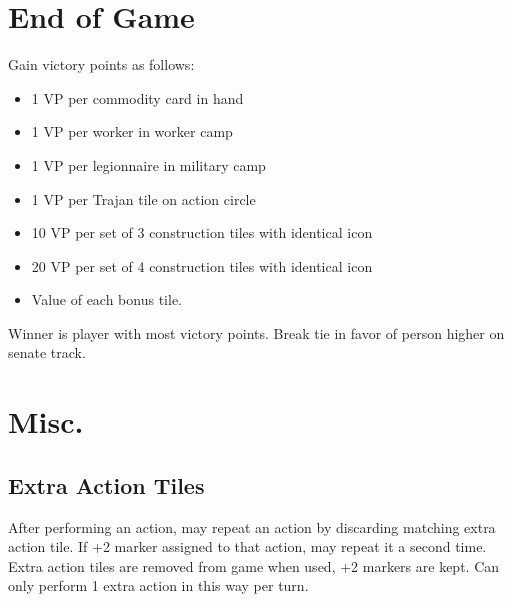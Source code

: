 \documentclass[10pt]{article}
\newenvironment{itemizeCustom}
{\begin{itemize}
  \setlength{\itemsep}{1pt}
  \setlength{\parskip}{0pt}
  \setlength{\parsep}{0pt}}
{\end{itemize}}
\begin{document}
\begin{multicols*}{2}
\section*{End of Game}
Gain victory points as follows:
\begin{itemizeCustom}
    \item 1 VP per commodity card in hand
    \item 1 VP per worker in worker camp
    \item 1 VP per legionnaire in military camp
    \item 1 VP per Trajan tile on action circle
    \item 10 VP per set of 3 construction tiles with identical icon
    \item 20 VP per set of 4 construction tiles with identical icon
    \item Value of each bonus tile.
\end{itemizeCustom}

Winner is player with most victory points. Break tie in favor of person higher on senate track.

\section*{Misc.}
\subsection*{Extra Action Tiles}
After performing an action, may repeat an action by discarding matching extra action tile. If +2 marker assigned to that action, may repeat it a second time. Extra action tiles are removed from game when used, +2 markers are kept. Can only perform 1 extra action in this way per turn.

\end{multicols*}
\end{document}
